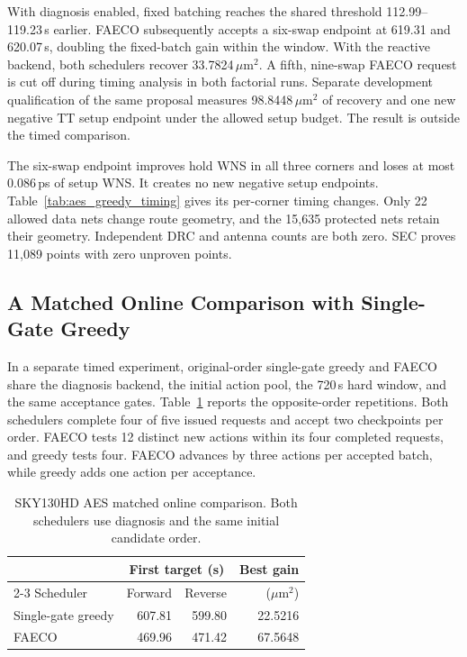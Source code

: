 \documentclass[journal]{IEEEtran}
\newcommand{\um}{\ensuremath{\mu\mathrm{m}^{2}}}
\begin{document}
With diagnosis enabled, fixed batching reaches the shared threshold 112.99--119.23\,s earlier. FAECO subsequently accepts a six-swap endpoint at 619.31 and 620.07\,s, doubling the fixed-batch gain within the window. With the reactive backend, both schedulers recover 33.7824\,\um. A fifth, nine-swap FAECO request is cut off during timing analysis in both factorial runs. Separate development qualification of the same proposal measures 98.8448\,\um{} of recovery and one new negative TT setup endpoint under the allowed setup budget. The result is outside the timed comparison.

The six-swap endpoint improves hold WNS in all three corners and loses at most 0.086\,ps of setup WNS. It creates no new negative setup endpoints. Table~\ref{tab:aes_greedy_timing} gives its per-corner timing changes. Only 22 allowed data nets change route geometry, and the 15,635 protected nets retain their geometry. Independent DRC and antenna counts are both zero. SEC proves 11,089 points with zero unproven points.

\subsection{A Matched Online Comparison with Single-Gate Greedy}

In a separate timed experiment, original-order single-gate greedy and FAECO share the diagnosis backend, the initial action pool, the 720\,s hard window, and the same acceptance gates. Table~\ref{tab:aes_greedy} reports the opposite-order repetitions. Both schedulers complete four of five issued requests and accept two checkpoints per order. FAECO tests 12 distinct new actions within its four completed requests, and greedy tests four. FAECO advances by three actions per accepted batch, while greedy adds one action per acceptance.

\begin{table}[t]
\centering
\caption{SKY130HD AES matched online comparison. Both schedulers use diagnosis and the same initial candidate order.}
\label{tab:aes_greedy}
\footnotesize
\begin{tabular}{lrrr}
\toprule
& \multicolumn{2}{c}{First target (s)} & Best gain\\
\cmidrule(lr){2-3}
Scheduler & Forward & Reverse & (\um)\\
\midrule
Single-gate greedy & 607.81 & 599.80 & 22.5216\\
FAECO & 469.96 & 471.42 & 67.5648\\
\bottomrule
\end{tabular}
\end{table}
\end{document}
